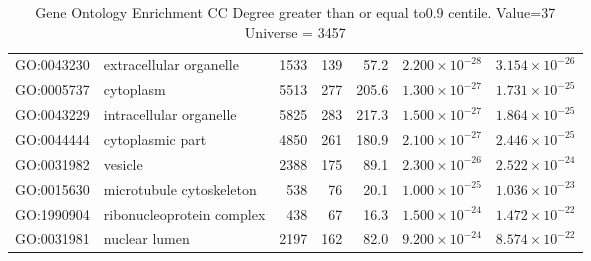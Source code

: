 \begin{table}[ht]
\begin{adjustbox}{max width=\textwidth}
\begin{tabular}{llrrrrr}
  GO:0043230 & extracellular organelle & 1533 & 139 & 57.2 & $2.200 \times 10^{-28}$ & $3.154 \times 10^{-26}$ \\ 
  GO:0005737 & cytoplasm & 5513 & 277 & 205.6 & $1.300 \times 10^{-27}$ & $1.731 \times 10^{-25}$ \\ 
  GO:0043229 & intracellular organelle & 5825 & 283 & 217.3 & $1.500 \times 10^{-27}$ & $1.864 \times 10^{-25}$ \\ 
  GO:0044444 & cytoplasmic part & 4850 & 261 & 180.9 & $2.100 \times 10^{-27}$ & $2.446 \times 10^{-25}$ \\ 
  GO:0031982 & vesicle & 2388 & 175 & 89.1 & $2.300 \times 10^{-26}$ & $2.522 \times 10^{-24}$ \\ 
  GO:0015630 & microtubule cytoskeleton & 538 & 76 & 20.1 & $1.000 \times 10^{-25}$ & $1.036 \times 10^{-23}$ \\ 
  GO:1990904 & ribonucleoprotein complex & 438 & 67 & 16.3 & $1.500 \times 10^{-24}$ & $1.472 \times 10^{-22}$ \\ 
  GO:0031981 & nuclear lumen & 2197 & 162 & 82.0 & $9.200 \times 10^{-24}$ & $8.574 \times 10^{-22}$ \\ 
   \hline
\end{tabular}
\end{adjustbox}
\caption{Gene Ontology Enrichment CC Degree  greater than or equal to0.9 centile.   Value=37 Universe = 3457} 
\label{tab:Gene Ontology Enrichment CC Degree  greater than or equal to0.9 centile.   Value=37 Universe = 3457}
\end{table}

